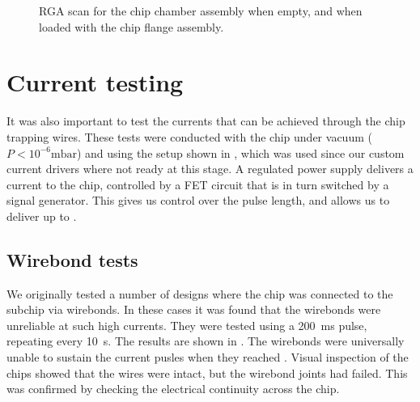 \begin{figure}[h]
  \centering
  \caption{RGA scan for the chip chamber assembly when empty, and when loaded
  with the chip flange assembly.}
  \label{exper:fig:rga}
\end{figure}

\section{Current testing}

It was also important to test the currents that can be achieved through the
chip trapping wires. These tests were conducted with the chip under vacuum
($P<10^{-6}\si{\milli\bar}$) and using the setup shown in
, which was used since our custom current drivers
where not ready at this stage. A regulated power supply delivers a current to
the chip, controlled by a FET circuit that is in turn switched by a signal
generator. This gives us control over the pulse length, and allows us to
deliver up to .

\begin{figure}
  \centering
  \caption{}
  \label{exper:fig:curtest}
\end{figure}

\subsection{Wirebond tests}

We originally tested a number of designs where the chip was connected to the
subchip via wirebonds. In these cases it was found that the wirebonds were
unreliable at such high currents. They were tested using a
\SI{200}{\milli\second} pulse, repeating every \SI{10}{\second}. The results
are shown in \myfigref{}. The wirebonds were universally unable to sustain the
current pusles when they reached . Visual inspection of the
chips showed that the wires were intact, but the wirebond joints had failed.
This was confirmed by checking the electrical continuity across the chip.

